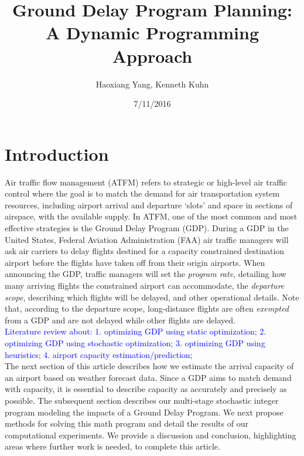 \documentclass[12pt]{article}
\title{Ground Delay Program Planning: A Dynamic Programming Approach}
\author{Haoxiang Yang, Kenneth Kuhn}
\date{7/11/2016}
\begin{document}
\maketitle

\section{Introduction}
	Air traffic flow management (ATFM) refers to strategic or high-level air traffic control where the goal is to match the demand for air transportation system resources, including airport arrival and departure `slots' and space in sections of airspace, with the available supply.  In ATFM, one of the most common and most effective strategies is the Ground Delay Program (GDP).  During a GDP in the United States, Federal Aviation Administration (FAA) air traffic managers will ask air carriers to delay flights destined for a capacity constrained destination airport before the flights have taken off from their origin airports.  When announcing the GDP, traffic managers will set the {\em program rate}, detailing how many arriving flights the constrained airport can accommodate, the {\em departure scope}, describing which flights will be delayed, and other operational details.  Note that, according to the departure scope, long-distance flights are often {\em exempted} from a GDP and are not delayed while other flights are delayed.\\
	\newline
	\textcolor{blue}{Literature review about: 1. optimizing GDP using static optimization; 2. optimizing GDP using stochastic optimization; 3. optimizing GDP using heuristics; 4. airport capacity estimation/prediction;}\\
	\newline
	The next section of this article describes how we estimate the arrival capacity of an airport based on weather forecast data.  Since a GDP aims to match demand with capacity, it is essential to describe capacity as accurately and precisely as possible.  The subsequent section describes our multi-stage stochastic integer program modeling the impacts of a Ground Delay Program.  We next propose methods for solving this math program and detail the results of our computational experiments.  We provide a discussion and conclusion, highlighting areas where further work is needed, to complete this article.
	
\end{document}
